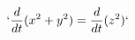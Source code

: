\documentclass[preview]{standalone}
\begin{document}
\begin{align*}
`\frac{d}{dt}(x^2 + y^2) = \frac{d}{dt}(z^2)`
\end{align*}
\end{document}
